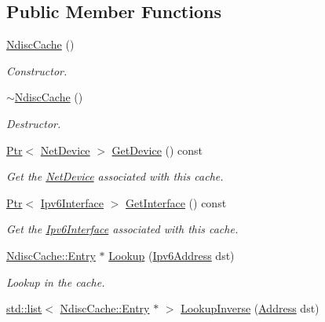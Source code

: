 \subsection*{Public Member Functions}
\begin{DoxyCompactItemize}
\item 
\hyperlink{classns3_1_1NdiscCache_a5d560cd5dcecb9a46e2f1aa97e91a6b3}{Ndisc\+Cache} ()
\begin{DoxyCompactList}\small\item\em Constructor. \end{DoxyCompactList}\item 
\hyperlink{classns3_1_1NdiscCache_aa0ceae10ef1e04b49cbc134136d18262}{$\sim$\+Ndisc\+Cache} ()
\begin{DoxyCompactList}\small\item\em Destructor. \end{DoxyCompactList}\item 
\hyperlink{classns3_1_1Ptr}{Ptr}$<$ \hyperlink{classns3_1_1NetDevice}{Net\+Device} $>$ \hyperlink{classns3_1_1NdiscCache_ad55473f8c2ff458b909ce9041625f2d8}{Get\+Device} () const 
\begin{DoxyCompactList}\small\item\em Get the \hyperlink{classns3_1_1NetDevice}{Net\+Device} associated with this cache. \end{DoxyCompactList}\item 
\hyperlink{classns3_1_1Ptr}{Ptr}$<$ \hyperlink{classns3_1_1Ipv6Interface}{Ipv6\+Interface} $>$ \hyperlink{classns3_1_1NdiscCache_aaca4169ab2a42da58647e4e4622024c1}{Get\+Interface} () const 
\begin{DoxyCompactList}\small\item\em Get the \hyperlink{classns3_1_1Ipv6Interface}{Ipv6\+Interface} associated with this cache. \end{DoxyCompactList}\item 
\hyperlink{classns3_1_1NdiscCache_1_1Entry}{Ndisc\+Cache\+::\+Entry} $\ast$ \hyperlink{classns3_1_1NdiscCache_a8a5fa7656fcbc9058fb8e1405a2728db}{Lookup} (\hyperlink{classns3_1_1Ipv6Address}{Ipv6\+Address} dst)
\begin{DoxyCompactList}\small\item\em Lookup in the cache. \end{DoxyCompactList}\item 
\hyperlink{openflow-interface_8h_afd9bcfa176617760671b67580f536fa7}{std\+::list}$<$ \hyperlink{classns3_1_1NdiscCache_1_1Entry}{Ndisc\+Cache\+::\+Entry} $\ast$ $>$ \hyperlink{classns3_1_1NdiscCache_aced04fde90c4b2acbaf163099eecaccc}{Lookup\+Inverse} (\hyperlink{classns3_1_1Address}{Address} dst)

\end{DoxyCompactItemize}
